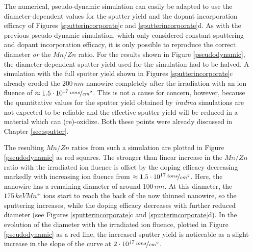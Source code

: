 The numerical, pseudo-dynamic simulation can easily be adapted to use the diameter-dependent values for the sputter yield and the dopant incorporation efficacy of Figures \ref{sputterincorporate}c and \ref{sputterincorporate}d. As with the previous pseudo-dynamic simulation, which only considered constant sputtering and dopant incorporation efficacy, it is only possible to reproduce the correct diameter \emph{or} the $Mn/Zn$ ratio. For the results shown in Figure \ref{pseudodynamic}, the diameter-dependent sputter yield used for the simulation had to be halved. A simulation with the full sputter yield shown in Figures \ref{sputterincorporate}c already eroded the $200\,nm$ nanowire completely after the irradiation with an ion fluence of $\approx 1.5\cdot 10^{17}\,\nicefrac{ions}{cm^2}$. This is not a cause for concern, however, because the quantitative values for the sputter yield obtained by \emph{iradina} simulations are not expected to be reliable and the effective sputter yield will be reduced in a material which can (re)-oxidize. Both these points were already discussed in Chapter \ref{sec:sputter}.

The resulting $Mn/Zn$ ratios from such a simulation are plotted in Figure \ref{pseudodynamic} as red squares. The stronger than linear increase in the $Mn/Zn$ ratio with the irradiated ion fluence is offset by the doping efficacy decreasing markedly with increasing ion fluence from $\approx 1.5\cdot 10^{17}\,\nicefrac{ions}{cm^2}$. Here, the nanowire has a remaining diameter of around $100\,nm$. At this diameter, the $175\,keV Mn^+$ ions start to reach the back of the now thinned nanowire, so the sputtering increases, while the doping efficacy decreases with further reduced diameter (see Figures \ref{sputterincorporate}c and \ref{sputterincorporate}d). In the evolution of the diameter with the irradiated ion fluence, plotted in Figure \ref{pseudodynamic} as a red line, the increased sputter yield is noticeable as a slight increase in the slope of the curve at $2\cdot 10^{17}\,\nicefrac{ions}{cm^2}$. 

